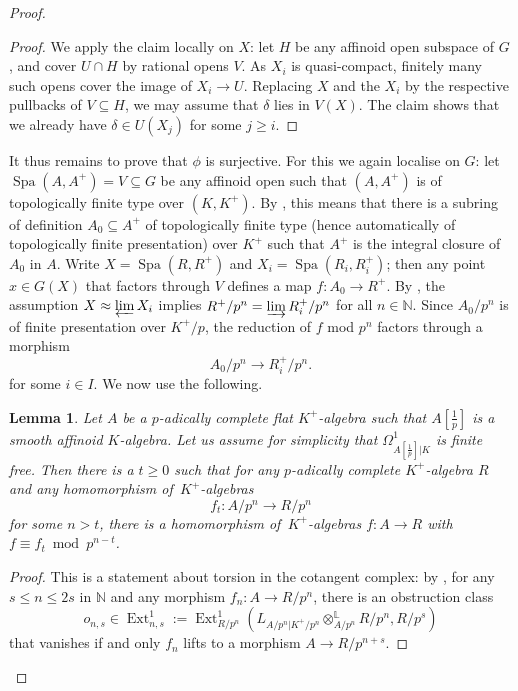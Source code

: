 \documentclass[11pt]{amsart}
\numberwithin{equation}{section}
\newtheorem{Lemma}[thm]{Lemma}
\theoremstyle{definition}
\theoremstyle{remark}
\newcommand{\lra}{\longrightarrow}
\newcommand{\N}{\mathbb{N}}
\newcommand{\Spa}{\operatorname{Spa}}
\newcommand{\tf}{[\tfrac{1}{p}]}
\newcommand{\Ext}{\operatorname{Ext}}
\begin{document}
\begin{proof}
\begin{proof}
        We apply the claim locally on $X$: let $H$ be any affinoid open subspace of $G$, and cover $U\cap H$ by rational opens $V$. As $X_i$ is quasi-compact, finitely many such opens cover the image of $X_i\to U$. Replacing $X$ and the $X_i$ by the respective pullbacks of $V\subseteq H$, we may assume that $\delta$ lies in $V(X)$. The claim shows that we already have $\delta\in U(X_j)$ for some $j\geq i$.
	 \end{proof}

        It thus remains to prove that $\phi$ is surjective. For this we again localise on $G$: let $\Spa(A,A^+)=V\subseteq G$ be any affinoid open such that $(A,A^+)$ is of topologically finite type over $(K,K^+)$. By \cite[Lemma~3.3(ii)]{Huber-ageneralisation}, this means that there is a subring of definition $A_0\subseteq A^+$ of topologically finite type (hence automatically of topologically finite presentation) over $K^+$ such that $A^+$ is the integral closure of $A_0$ in $A$.
 	 Write $X=\Spa(R,R^+)$ and $X_i=\Spa(R_i,R^+_i)$; then any point $x\in G(X)$ that factors through $V$ defines a map $f\colon A_0\to R^+$. By \cite[Lemma~3.10]{heuer-diamantine-Picard}, the assumption $X\approx \varprojlim X_i$ implies $R^+/p^n=\varinjlim R^+_i/p^n$ for all $n\in \N$. Since $A_0/p^n$ is of finite presentation over $K^+/p$, the reduction of $f$ mod $p^n$ factors through a morphism
 	\[ A_0/p^n\lra R_i^+/p^n.\]
 	for some $i\in I$. We now use the following. 
        
 	\begin{Lemma}\label{lem44}
 		Let $A$ be a  $p$-adically complete flat $K^+$-algebra such that $A\tf$ is a smooth affinoid $K$-algebra. Let us assume for simplicity that $\Omega^1_{A[\frac{1}{p}]|K}$ is finite free. Then there is a $t\geq 0$ such that for  any $p$-adically complete $K^+$-algebra $R$ and any homomorphism 
 		of\, $K^+$-algebras
 		\[f_t\colon A/p^n\lra R/p^n\]
 		for some $n>t$, there is a homomorphism of\, $K^+$-algebras $f\colon A\to R$ with $f\equiv f_t\bmod p^{n-t}$.
 	\end{Lemma}
        
 	\begin{proof}
 		This is a statement about torsion in the cotangent complex: by \cite[Proposition~III.2.2.4]{IllusieCotangent},  for any $s\leq n\leq 2s$ in $\N$ and any morphism
 		$f_n\colon A\to R/p^n$, there is 
 		 an obstruction class 
 		\[o_{n,s}\in \Ext_{n,s}^1:=\Ext^1_{R/p^n}\left(L_{A/p^n|K^+/p^n}\otimes_{A/p^n}^{\mathbb L}R/p^n,R/p^s\right)\]
 		that vanishes if and only $f_n$ lifts to a morphism $A\to R/p^{n+s}$.
                

\end{proof}
\end{proof}
\end{document}
